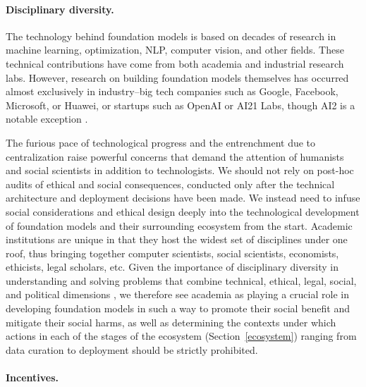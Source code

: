 \paragraph{Disciplinary diversity.}

The technology behind foundation models is based on decades of research in machine learning, optimization, NLP, computer vision, and other fields. These technical contributions have come from both academia and industrial research labs. However, research on building foundation models themselves has occurred almost exclusively in industry--big tech companies such as Google, Facebook, Microsoft, or Huawei, or startups such as OpenAI or AI21 Labs, though AI2 is a notable exception \citep{peters2018elmo,zellers2019neuralfakenews}.

The furious pace of technological progress and the entrenchment due to centralization raise powerful concerns that demand the attention of humanists and social scientists in addition to technologists. We should not rely on post-hoc audits of ethical and social consequences, conducted only after the technical architecture and deployment decisions have been made. We instead need to infuse social considerations and ethical design deeply into the technological development of foundation models and their surrounding ecosystem from the start. Academic institutions are unique in that they host the widest set of disciplines under one roof, thus bringing together computer scientists, social scientists, economists, ethicists, legal scholars, etc. Given the importance of disciplinary diversity in understanding and solving problems that combine technical, ethical, legal, social, and political dimensions \citep{hong2004groups,solomon2006norms,steel2018multiple}, we therefore see academia as playing a crucial role in developing foundation models in such a way to promote their social benefit and mitigate their social harms, as well as determining the contexts under which actions in each of the stages of the ecosystem (Section~\ref{ecosystem}) ranging from data curation to deployment should be strictly prohibited.

\paragraph{Incentives.}

